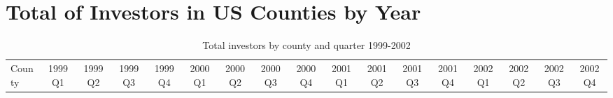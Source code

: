 \chapter{Total of Investors in US Counties by Year}
\label{App:CountiesCount}
   \begin{landscape}
   	  	\scriptsize 
   	  	\setlength\tabcolsep{1.5pt}
	\begin{longtable}{lcccccccccccccccc}
	
	\caption[Total Investors by County and Quarter 1999-2002]{Total investors by county and quarter 1999-2002}\\
	
	
County & 1999Q1 &1999Q2 &1999Q3 &1999Q4 &2000Q1 &2000Q2 &2000Q3 &2000Q4 &2001Q1 & 2001Q2 &2001Q3 &2001Q4 &2002Q1 &2002Q2 &2002Q3 & 2002Q4 \\


\end{longtable}
\end{landscape}
